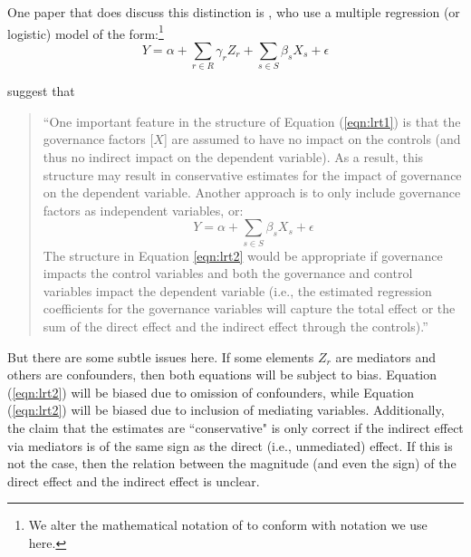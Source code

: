\documentclass[11pt,reqno]{amsart}
\begin{document}
\begin{doublespace}
One paper that does discuss this distinction is \citet{Larcker:2011bw}, who use a multiple regression (or logistic) model of the form:\footnote{We alter the mathematical notation of  \citet{Larcker:2011bw} to conform with notation we use here.}
\begin{equation}
Y = \alpha + \sum_{r \in R} \gamma _r Z_r + \sum_{s \in S} \beta_s X_s + \epsilon \label{eqn:lrt1}
\end{equation}

\citet{Larcker:2011bw} suggest that 
\begin{quote}
``One important feature in the structure of Equation (\ref{eqn:lrt1}) is that the governance factors [$X$] are assumed to have no impact on the controls (and thus no indirect impact on the dependent variable). 
As a result, this structure may result in conservative estimates for the impact of governance on the dependent variable. Another approach is to only include governance factors as independent variables, or:
\begin{equation}
Y = \alpha + \sum_{s \in S} \beta_s X_s + \epsilon \label{eqn:lrt2}
\end{equation}
The structure in Equation \ref{eqn:lrt2} would be appropriate if governance impacts the control variables and both the governance and control variables impact the dependent variable (i.e., the estimated regression coefficients for the governance variables will capture the total effect or the sum of the direct effect and the indirect effect through the controls).''
\end{quote}

But there are some subtle issues here.
If some elements $Z_r$ are mediators and others are confounders, then both equations will be subject to bias. 
Equation (\ref{eqn:lrt2}) will be biased due to omission of confounders, while Equation (\ref{eqn:lrt2})  will be biased due to inclusion of mediating variables.
Additionally, the claim that the estimates are ``conservative" is only correct if the indirect effect via mediators is of the same sign as the direct (i.e., unmediated) effect. 
If this is not the case, then the relation between the magnitude (and even the sign) of the direct effect and the indirect effect is unclear.


\end{doublespace}
\end{document}
